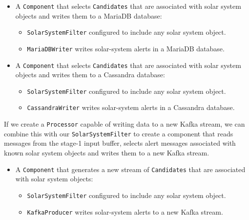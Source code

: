 \documentclass{article}
\newcommand{\kafka} {Kafka\xspace}
\newcommand{\cassandra} {Cassandra\xspace}
\newcommand{\mariadb} {MariaDB\xspace}
\newcommand{\stageone} {stage-1\xspace}
\begin{document}
\begin{itemize}
    \item A \texttt{Component} that selects \texttt{Candidates} that are associated with solar system objects and writes them to a \mariadb database:
    \begin{itemize}
        \item \texttt{SolarSystemFilter} configured to include any solar system object.
    \end{itemize}
    \begin{itemize}
        \item \texttt{MariaDBWriter} writes solar-system alerts in a \mariadb database.
    \end{itemize}
\end{itemize}

\begin{itemize}
    \item A \texttt{Component} that selects \texttt{Candidates} that are associated with solar system objects and writes them to a \cassandra database:
    \begin{itemize}
        \item \texttt{SolarSystemFilter} configured to include any solar system object.
    \end{itemize}
    \begin{itemize}
        \item \texttt{CassandraWriter} writes solar-system alerts in a \cassandra database.
    \end{itemize}
\end{itemize}

If we create a \texttt{Processor} capable of writing data to a new \kafka stream, we can combine this with our \texttt{SolarSystemFilter} to create a component that reads messages from the \stageone input buffer, selects alert messages associated with known solar system objects and writes them to a new \kafka stream.

\begin{itemize}
    \item A \texttt{Component} that generates a new stream of \texttt{Candidates} that are associated with solar system objects:
    \begin{itemize}
        \item \texttt{SolarSystemFilter} configured to include any solar system object.
    \end{itemize}
    \begin{itemize}
        \item \texttt{KafkaProducer} writes solar-system alerts to a new \kafka stream.
    \end{itemize}
\end{itemize}
\end{document}
